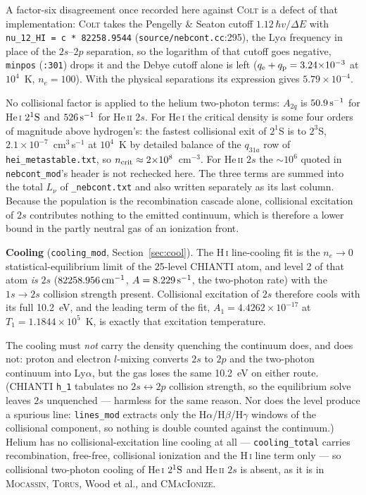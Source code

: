 \documentclass[english,a4paper]{my_memo}
\newcommand{\code}[1]{\texttt{#1}}
\begin{document}
A factor-six disagreement once recorded here against \textsc{Colt} is a
defect of that implementation: \textsc{Colt} takes the Pengelly \& Seaton
cutoff $1.12\,\hbar v/\Delta E$ with \code{nu\_12\_HI = c * 82258.9544}
(\code{source/nebcont.cc}:295), the Ly$\alpha$ frequency in place of the
$2s$--$2p$ separation, so the logarithm of that cutoff goes negative,
\code{minpos} (\code{:301}) drops it and the Debye cutoff alone is left
($q_{\rm e}+q_{\rm p} = 3.24{\times}10^{-3}$ at $10^4$~K, $n_e = 100$).  With
the physical separations its expression gives $5.79{\times}10^{-4}$.

No collisional factor is applied
to the helium two-photon terms: $A_{2q}$ is $50.9\,{\rm s^{-1}}$ for
He\,\textsc{i} $2^1{\rm S}$ and $526\,{\rm s^{-1}}$ for He\,\textsc{ii}
$2s$.  For He\,\textsc{i} the critical density is some four orders of
magnitude above hydrogen's: the fastest collisional exit of $2^1$S is to
$2^3$S, $2.1{\times}10^{-7}$~cm$^3$\,s$^{-1}$ at $10^4$~K by detailed balance
of the $q_{31a}$ row of \code{hei\_metastable.txt}, so $n_{\rm crit} \approx
2{\times}10^8$~cm$^{-3}$.  For He\,\textsc{ii} $2s$ the $\sim10^{6}$
quoted in \code{nebcont\_mod}'s header is not rechecked here.  The three terms are summed into the total $L_\nu$ of
\code{\_nebcont.txt} and also written separately as its last column.
Because the population is the recombination cascade alone, collisional
excitation of $2s$ contributes nothing to the emitted continuum, which is
therefore a lower bound in the partly neutral gas of an ionization front.

\textbf{Cooling} (\code{cooling\_mod}, Section~\ref{sec:cool}).  The
H\,\textsc{i} line-cooling fit is the $n_e \rightarrow 0$
statistical-equilibrium limit of the 25-level CHIANTI atom, and level 2 of
that atom \emph{is} $2s$ ($82258.956\,{\rm cm^{-1}}$, $A = 8.229\,{\rm
s^{-1}}$, the two-photon rate) with the $1s \rightarrow 2s$ collision
strength present.  Collisional excitation of $2s$ therefore cools with its
full 10.2~eV, and the leading term of the fit,
$A_1 = 4.4262{\times}10^{-17}$ at $T_1 = 1.1844{\times}10^{5}$~K, is exactly
that excitation temperature.

The cooling must \emph{not} carry the density quenching the continuum
does, and does not: proton and electron $l$-mixing converts $2s$ to $2p$
and the two-photon continuum into Ly$\alpha$, but the gas loses the same
10.2~eV on either route.  (CHIANTI \code{h\_1} tabulates no
$2s \leftrightarrow 2p$ collision strength, so the equilibrium solve leaves
$2s$ unquenched --- harmless for the same reason.  Nor does the level
produce a spurious line: \code{lines\_mod} extracts only the
H$\alpha$/H$\beta$/H$\gamma$ windows of the collisional component, so
nothing is double counted against the continuum.)  Helium has no
collisional-excitation line cooling at all --- \code{cooling\_total} carries
recombination, free-free, collisional ionization and the H\,\textsc{i} line
term only --- so collisional two-photon cooling of He\,\textsc{i}
$2^1{\rm S}$ and He\,\textsc{ii} $2s$ is absent, as it is in \textsc{Mocassin},
\textsc{Torus}, Wood et al., and \textsc{CMacIonize}.
\end{document}

